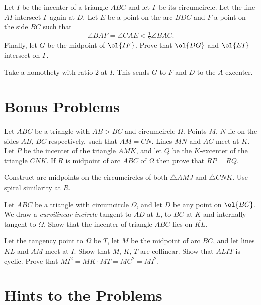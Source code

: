 \documentclass[11pt]{scrartcl}
\begin{document}
\begin{problem}
  [IMO 2010]
  Let $I$ be the incenter of a triangle $ABC$ and let $\Gamma$ be its circumcircle.
  Let the line $AI$ intersect $\Gamma$ again at $D$.
  Let $E$ be a point on the arc $BDC$ and $F$ a point on the side $BC$ such that
  \[ \angle BAF = \angle CAE < \tfrac12 \angle BAC . \]
  Finally, let $G$ be the midpoint of $\ol{IF}$. Prove that $\ol{DG}$ and $\ol{EI}$ intersect on $\Gamma$.
  \begin{hint}
    Take a homothety with ratio $2$ at $I$.
    This sends $G$ to $F$ and $D$ to the $A$-excenter.
  \end{hint}
\end{problem}

\section{Bonus Problems}
\begin{problem}
  [Russia 2014] Let $ABC$ be a triangle with $AB>BC$ and circumcircle $\Omega$.
  Points $M$, $N$ lie on the sides $AB$, $BC$ respectively, such that $AM=CN$.
  Lines $MN$ and $AC$ meet at $K$.
  Let $P$ be the incenter of the triangle $AMK$, and let $Q$ be the $K$-excenter of the triangle $CNK$.
  If $R$ is midpoint of arc $ABC$ of $\Omega$ then prove that $RP=RQ$.
  \begin{hint}
    Construct arc midpoints on the circumcircles of both $\triangle AMJ$ and $\triangle CNK$.
    Use spiral similarity at $R$.
  \end{hint}
\end{problem}
\begin{problem}
  Let $ABC$ be a triangle with circumcircle $\Omega$, and let $D$ be any point on $\ol{BC}$.
  We draw a \emph{curvilinear incircle} tangent to $\overline{AD}$ at $L$, to $\overline{BC}$ at $K$
  and internally tangent to $\Omega$.
  Show that the incenter of triangle $ABC$ lies on $\overline{KL}$.
  \begin{hint}
    Let the tangency point to $\Omega$ be $T$, let $M$ be the midpoint of arc $BC$,
    and let lines $KL$ and $AM$ meet at $I$.
    Show that $M$, $K$, $T$ are collinear.
    Show that $ALIT$ is cyclic.
    Prove that $MI^2 = MK \cdot MT = MC^2 = MI^2$.
  \end{hint}
\end{problem}


\eject

\section{Hints to the Problems}
\begin{enumerate}

\end{enumerate}
\end{document}
